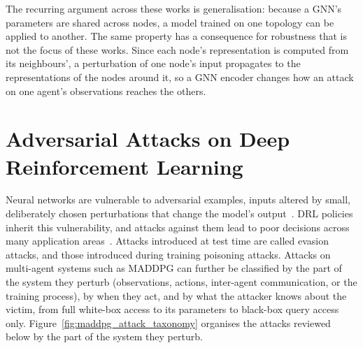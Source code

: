 The recurring argument across these works is generalisation: because a GNN's
parameters are shared across nodes, a model trained on one topology can be applied to
another. The same property has a consequence for robustness that is not the focus of
these works. Since each node's representation is computed from its neighbours', a
perturbation of one node's input propagates to the representations of the nodes around
it, so a GNN encoder changes how an attack on one agent's observations reaches the
others.

\section{Adversarial Attacks on Deep Reinforcement Learning}
\label{sec:lit_attacks}

Neural networks are vulnerable to adversarial examples, inputs altered by small,
deliberately chosen perturbations that change the model's
output~\cite{szegedy2014intriguingpropertiesneuralnetworks}. DRL policies inherit this
vulnerability, and attacks against them lead to poor decisions across many application
areas~\cite{alzubaidi2025adversarial,zhou2024adversarial,finlayson2019adversarialexample}.
Attacks introduced at test time are called evasion attacks, and those introduced during
training poisoning attacks. Attacks on multi-agent systems such as MADDPG can further be
classified by the part of the system they perturb (observations, actions, inter-agent
communication, or the training process), by when they act, and by what the attacker
knows about the victim, from full white-box access to its parameters to black-box query
access only. Figure~\ref{fig:maddpg_attack_taxonomy} organises the attacks reviewed below
by the part of the system they perturb.

